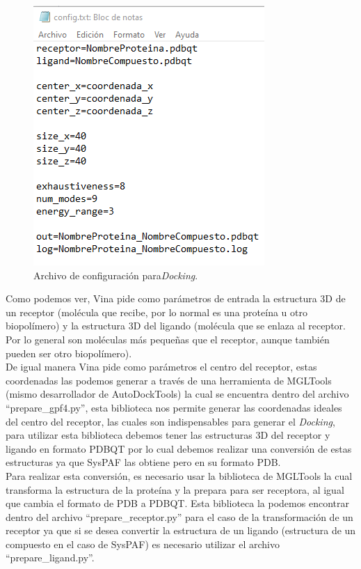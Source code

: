 {\begin{figure}[H]
    \centering
    \includegraphics[scale=.99]{Capitulo4/Documentos/imagenes_entorno/archivo_entrada.png}
    \caption{Archivo de configuración para\textit{Docking}.}
    \label{dock_ing}
\end{figure}

\noindent Como podemos ver, Vina pide como parámetros de entrada la estructura 3D de un receptor (molécula que recibe, por lo normal es una proteína u otro biopolímero) y la estructura 3D del ligando (molécula que se enlaza al receptor. Por lo general son moléculas más pequeñas que el receptor, aunque también pueden ser otro biopolímero).\\

\noindent De igual manera Vina pide como parámetros el centro del receptor, estas coordenadas las podemos generar a través de una herramienta de MGLTools (mismo desarrollador de AutoDockTools) la cual se encuentra dentro del archivo “prepare\_gpf4.py”, esta biblioteca nos permite generar las coordenadas ideales del centro del receptor, las cuales son indispensables para generar el \textit{Docking}, para utilizar esta biblioteca debemos tener las estructuras 3D del receptor y ligando en formato PDBQT por lo cual debemos realizar una conversión de estas estructuras ya que SysPAF las obtiene pero en su formato PDB.\\

\noindent Para realizar esta conversión, es necesario usar la biblioteca de MGLTools la cual transforma la estructura de la proteína y la prepara para ser receptora, al igual que cambia el formato de PDB a PDBQT. Esta biblioteca la podemos encontrar dentro del archivo “prepare\_receptor.py” para el caso de la transformación de un receptor ya que si se desea convertir la estructura de un ligando (estructura de un compuesto en el caso de SysPAF) es necesario utilizar el archivo “prepare\_ligand.py”.\\

}
